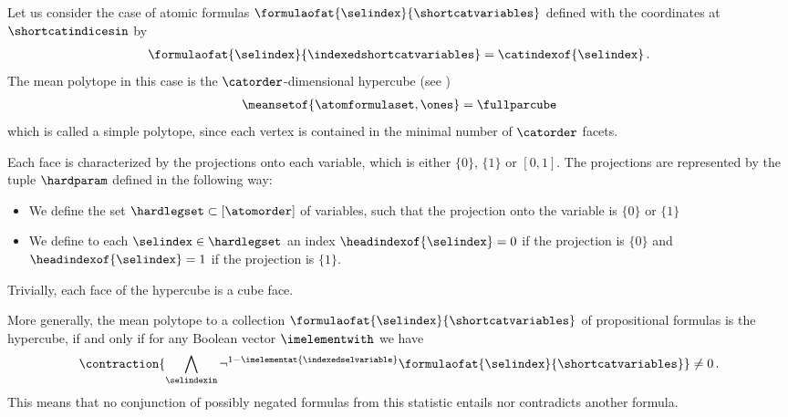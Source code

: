 \begin{example}
    \label{exa:atomicFormulasHypercube}
    Let us consider the case of atomic formulas $\formulaofat{\selindex}{\shortcatvariables}$ defined with the coordinates at $\shortcatindicesin$ by
    \begin{align*}
        \formulaofat{\selindex}{\indexedshortcatvariables}
        = \catindexof{\selindex} \, .
    \end{align*}
    The mean polytope in this case is the $\catorder$-dimensional hypercube (see )
    \begin{align*}
        \meansetof{\atomformulaset,\ones}
        = \fullparcube
    \end{align*}
    which is called a simple polytope, since each vertex is contained in the minimal number of $\catorder$ facets.

    Each face is characterized by the projections onto each variable, which is either $\{0\}$, $\{1\}$ or $[0,1]$.
    The projections are represented by the tuple $\hardparam$ defined in the following way:
    \begin{itemize}
        \item We define the set $\hardlegset\subset[\atomorder]$ of variables, such that the projection onto the variable is $\{0\}$ or $\{1\}$
        \item We define to each $\selindex\in\hardlegset$ an index $\headindexof{\selindex}=0$ if the projection is $\{0\}$ and $\headindexof{\selindex}=1$ if the projection is $\{1\}$.
    \end{itemize}
    Trivially, each face of the hypercube is a cube face. %

    More generally, the mean polytope to a collection $\formulaofat{\selindex}{\shortcatvariables}$ of propositional formulas is the hypercube, if and only if for any Boolean vector $\imelementwith$ we have
    \begin{align*}
        \contraction{\bigwedge_{\selindexin}\lnot^{1-\imelementat{\indexedselvariable}}\formulaofat{\selindex}{\shortcatvariables}}
        \neq 0 \, .
    \end{align*}
    This means that no conjunction of possibly negated formulas from this statistic entails nor contradicts another formula.

\end{example}
